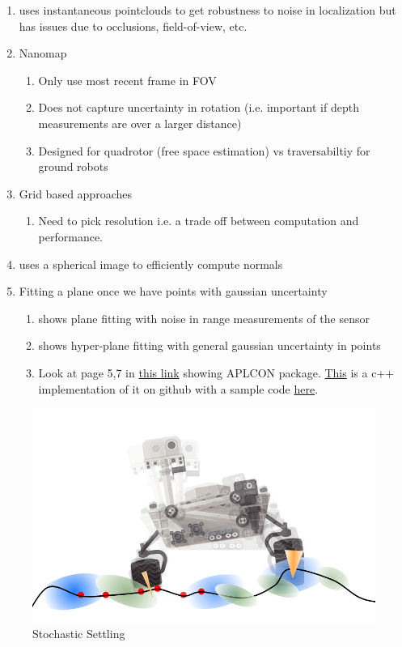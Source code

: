 \documentclass[letterpaper, 10 pt, conference]{ieeeconf}  %
\begin{document}
\begin{enumerate}
    \item \cite{InstPcWafr2016} uses instantaneous pointclouds to get robustness to noise in localization but has issues due to occlusions, field-of-view, etc.
    \item \cite{nanomap2018} Nanomap
    \begin{enumerate}
        \item Only use most recent frame in FOV
        \item Does not capture uncertainty in rotation (i.e. important if depth measurements are over a larger distance)
        \item Designed for quadrotor (free space estimation) vs traversabiltiy for ground robots
    \end{enumerate}
    \item Grid based approaches \cite{hornung2013octomap} \cite{agha2017CRM}
    \begin{enumerate}
        \item Need to pick resolution i.e. a trade off between computation and performance.
    \end{enumerate}
    \item \cite{sphericalImage} uses a spherical image to efficiently compute normals
    \item Fitting a plane once we have points with gaussian uncertainty
    \begin{enumerate}
        \item \cite{planeFitUnc2010} shows plane fitting with noise in range measurements of the sensor
        \item \cite{hyperfit2015} shows hyper-plane fitting with general gaussian uncertainty in points
        \item Look at page 5,7 in \href{http://www.desy.de/~blobel/apltalk.pdf}{this link} showing APLCON package. 
        \href{https://github.com/neiser/APLCONpp}{This} is a c++ implementation of it on github with a sample code \href{https://github.com/neiser/APLCONpp}{here}.
    \end{enumerate}
\end{enumerate}

\begin{figure}[t!]
    \centering
    \includegraphics[width=0.95\linewidth]{figs/RoverOnBeliefCloud.png}
    \caption{Stochastic Settling}
    \label{fig:s_settling}
\end{figure}
\end{document}
